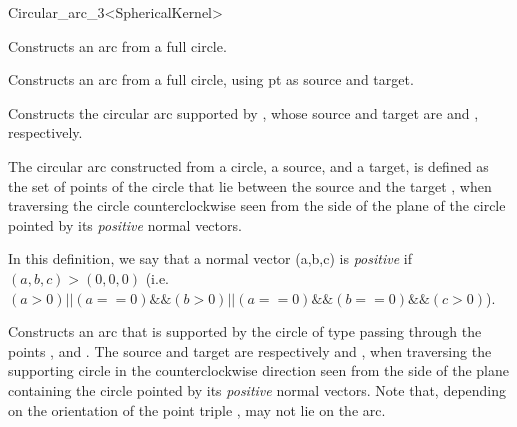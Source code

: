 \begin{ccRefClass}{Circular_arc_3<SphericalKernel>}


\ccIsModel


\ccCreation
{}

\ccThreeToTwo

{Constructs an arc from a full circle.}

{Constructs an arc from a full circle, using pt as source and target.}

{Constructs the circular arc supported by , whose source and target 
are  and , respectively.
}

The circular arc constructed from a circle, a source, and a target, is
defined as the set of points of the circle that lie between the source 
and the target , when traversing the circle counterclockwise
seen from the side of the plane of the circle pointed by its \textit{positive} normal 
vectors.

In this definition, we say that a normal vector (a,b,c) is \textit{positive} if 
$(a,b,c)>(0,0,0)$ (i.e. $(a>0) || (a==0) \&\& (b>0) || (a==0)\&\&(b==0)\&\&(c>0)$).

{Constructs an arc that is supported by the circle of type
   passing through the points ,
   and . The source and target are respectively 
  and , when traversing the supporting circle in the
  counterclockwise direction 
  seen from the side of the plane containing the circle pointed by its \textit{positive}
  normal vectors.
  Note that, depending on the orientation of the point triple
  ,  may not lie on the arc. 
}


\end{ccRefClass}
